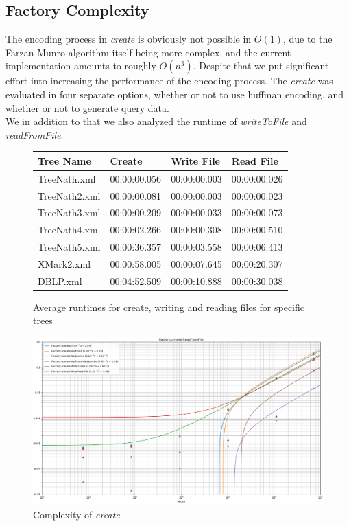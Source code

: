 \documentclass{article}
\begin{document}
\subsection{Factory Complexity}
The encoding process in \textit{create} is obviously not possible in $O(1)$, due to the Farzan-Munro algorithm itself being more complex, and the current implementation amounts to roughly $O(n^{3})$. Despite that we put significant effort into increasing the performance of the encoding process. The \textit{create} was evaluated in four separate options, whether or not to use huffman encoding, and whether or not to generate query data.\\
We in addition to that we also analyzed the runtime of \textit{writeToFile} and \textit{readFromFile}.
\begin{figure}[h]
	\begin{tabular}{ |p{3cm}||p{}|p{}|p{}| }
		 \hline
		 Tree Name & Create & Write File &Read File\\
		 \hline
		 TreeNath.xml   & 00:00:00.056    & 00:00:00.003 &   00:00:00.026 \\
		 TreeNath2.xml&   00:00:00.081  & 00:00:00.003   & 00:00:00.023 \\
		 TreeNath3.xml&00:00:00.209 &00:00:00.033&  00:00:00.073\\
		 TreeNath4.xml&00:00:02.266& 00:00:00.308&  00:00:00.510\\
		 TreeNath5.xml&00:00:36.357&00:00:03.558&00:00:06.413\\
		 XMark2.xml&00:00:58.005&00:00:07.645&00:00:20.307\\
		 DBLP.xml&00:04:52.509&00:00:10.888&00:00:30.038\\
		 \hline
	\end{tabular}
\caption{Average runtimes for create, writing and reading files for specific trees}
\label{complexFac:table1}
\end{figure}
\begin{figure}[h]
\includegraphics[scale=0.3]{file_comp_cut}
\caption{Complexity of \textit{create}}
\label{complexFac:image1}
\end{figure}
\end{document}
